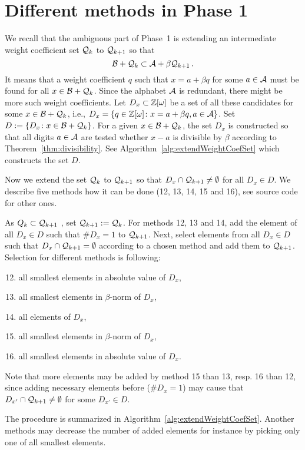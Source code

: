 \section{Different methods in Phase 1}
\label{sec:methodsOne}


We recall that the ambiguous part of Phase~1 is extending an intermediate weight coefficient set $\mathcal{Q}_k$ to $\mathcal{Q}_{k+1}$ so that 
$$
\mathcal{B}+\mathcal{Q}_k \subset \mathcal{A}+\beta \mathcal{Q}_{k+1}\,.
$$
It means that a weight coefficient $q$ such that $x=a+\beta q$ for some $a\in\mathcal{A}$ must be found for all $x\in \mathcal{B}+\mathcal{Q}_k$. Since the alphabet $\mathcal{A}$ is redundant, there might be more such weight coefficients. Let $D_x\subset \mathbb{Z}[\omega]$ be a set of all these candidates for some $x\in \mathcal{B}+\mathcal{Q}_k$, i.e., $D_x=\{q\in\mathbb{Z}[\omega]\colon x=a+\beta q, a\in\mathcal{A}\}$. Set $D:=\{D_x\colon x\in \mathcal{B}+\mathcal{Q}_k\}$. For a given $x\in \mathcal{B}+\mathcal{Q}_k$, the set $D_x$ is constructed so that all digits $a\in\mathcal{A}$ are tested whether $x-a$ is divisible by $\beta$ according to Theorem~\ref{thm:divisibility}. See Algorithm~\ref{alg:extendWeightCoefSet} which constructs the set $D$.

Now we extend the set $\mathcal{Q}_k$ to $\mathcal{Q}_{k+1}$ so that $D_x \cap \mathcal{Q}_{k+1} \neq \emptyset$ for all $D_x \in D$. We describe five methods how it can be done (12, 13, 14, 15 and 16), see source code for other ones. 

As $Q_k\subset \mathcal{Q}_{k+1}$ , set $\mathcal{Q}_{k+1}:=\mathcal{Q}_k$. For methods 12, 13 and 14, add  the element of all $D_x\in D$ such that $\#D_x=1$ to $\mathcal{Q}_{k+1}$. Next, select elements from all $D_x\in D$ such that $D_x \cap \mathcal{Q}_{k+1} = \emptyset$ according to a chosen method and add them to $\mathcal{Q}_{k+1}$. Selection for different methods is following:
\begin{enumerate}[ method 1 --]
	\setcounter{enumi}{11}
	\item all smallest elements in absolute value of $D_x$,
	\item all smallest elements in $\beta$-norm of $D_x$,
	\item all elements of $D_x$,
	\item all smallest elements in $\beta$-norm of $D_x$,
	\item all smallest elements in absolute value of $D_x$.
\end{enumerate}
Note that more elements may be added by method 15 than 13, resp. 16 than 12, since adding necessary elements before ($\#D_x=1$)  may cause that $D_{x'}\cap \mathcal{Q}_{k+1} \neq \emptyset$ for some $D_{x'}\in D$. 

The procedure is summarized in Algorithm~\ref{alg:extendWeightCoefSet}. 
Another methods may decrease the number of added elements for instance by picking only one of all smallest elements.
	


